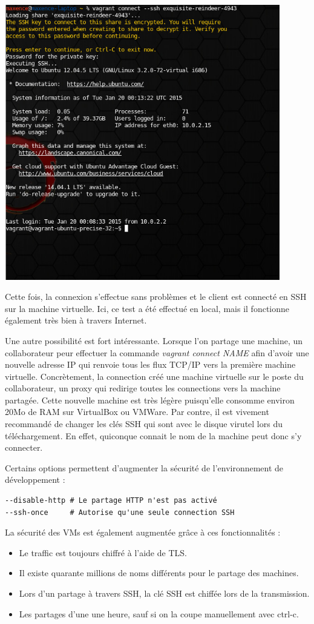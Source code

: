 \documentclass[12pt,a4paper]{article}
\begin{document}
\begin{center}
	\includegraphics[width=12cm]{images_rapport/vagrantconnect.jpg}
\end{center}

Cette fois, la connexion s'effectue sans problèmes et le client est connecté en SSH sur la machine virtuelle.  Ici, ce test a été effectué en local, mais il fonctionne également très bien à travers Internet.

Une autre possibilité est fort intéressante. Lorsque l'on partage une machine, un collaborateur peur effectuer la commande \textit{vagrant connect NAME} afin d'avoir une nouvelle adresse IP qui renvoie tous les flux TCP/IP vers la première machine virtuelle. Concrètement, la connection créé une machine virtuelle sur le poste du collaborateur, un proxy qui redirige toutes les connections vers la machine partagée. Cette nouvelle machine est très légère puisqu'elle consomme environ 20Mo de RAM sur VirtualBox ou VMWare. Par contre, il est vivement recommandé de changer les clés SSH qui sont avec le disque virutel lors du téléchargement. En effet, quiconque connait le nom de la machine peut donc s'y connecter. 

Certains options permettent d'augmenter la sécurité de l'environnement de développement :
\begin{lstlisting}
--disable-http # Le partage HTTP n'est pas activé
--ssh-once     # Autorise qu'une seule connection SSH
\end{lstlisting}
La sécurité des VMs est également augmentée grâce à ces fonctionnalités :
\begin{itemize}
	\item{Le traffic est toujours chiffré à l'aide de TLS.}
	\item{Il existe quarante millions de noms différents pour le partage des machines.}
	\item{Lors d'un partage à travers SSH, la clé SSH est chiffée lors de la transmission.}
	\item{Les partages d'une une heure, sauf si on la coupe manuellement avec ctrl-c.}
\end{itemize}
\end{document}
